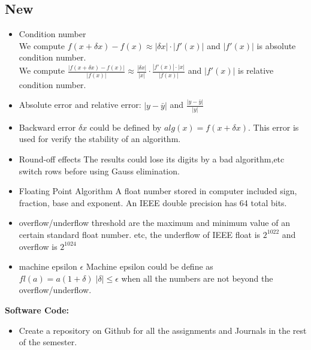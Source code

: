 \documentclass{article}
\begin{document}
\subsection*{New}
\begin{itemize}
\item Condition number\\
We compute $f(x+\delta x)-f(x) \approx |\delta x|\cdot |f'(x)|$ and $|f'(x)|$ is absolute condition number.\\
We compute $\frac{|f(x+\delta x)-f(x)|}{|f(x)|}  \approx \frac{|\delta x|}{|x| }\cdot \frac{|f'(x)| \cdot |x|}{|f(x)|}$ and $|f'(x)|$ is relative condition number.
\item Absolute error and relative error: $|y-\bar y|$ and $\frac{|y-\bar y|}{|y|}$
\item Backward error $\delta x$ could be defined by $alg(x) = f(x + \delta x)$. This error is used for verify the stability of an algorithm. 
\item Round-off effects The results could lose its digits by a bad algorithm,etc switch rows before using Gauss elimination.
\item Floating Point Algorithm
A float number stored in computer included sign, fraction, base and exponent. An IEEE double precision has 64 total bits. 
\item overflow/underflow threshold are the maximum and minimum value of an certain standard float number. etc, the underflow of IEEE float is $2^{1022}$ and overflow is $2^1024$
\item machine epsilon $\epsilon$ 
Machine epsilon could be define as $ fl(a) = a(1+ \delta ) \; | \delta | \leq \epsilon $ when all the numbers are not beyond the overflow/underflow.

\end{itemize}

\textbf{Software Code:}
 \begin{itemize}
\item Create a repository on Github for all the assignments and Journals in the rest of the semester.
\end{itemize}
\end{document}
